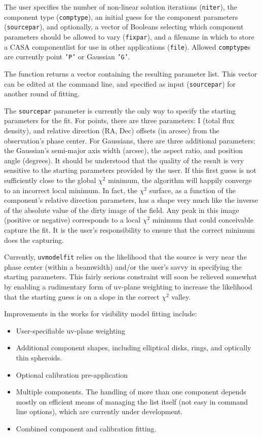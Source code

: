 The user specifies the number of non-linear solution
iterations ({\tt niter}), the component type ({\tt comptype}), an
initial guess for the component parameters ({\tt sourcepar}), and
optionally, a vector of Booleans selecting which component parameters
should be allowed to vary ({\tt fixpar}), and a filename in which to
store a CASA componentlist for use in other applications ({\tt file}).
Allowed {\tt comptype}s are currently point {\tt 'P'} or
Gaussian {\tt 'G'}.

The function returns a vector containing the resulting parameter list.
This vector can be edited at the command line, and specified as input
({\tt sourcepar}) for another round of fitting.

The {\tt sourcepar} parameter is currently the only way to specify the
starting parameters for the fit.  For points, there are three
parameters: I (total flux density), and relative direction (RA, Dec)
offsets (in arcsec) from the observation's phase center.  For
Gaussians, there are three additional parameters: the Gaussian's
semi-major axis width (arcsec), the aspect ratio, and position angle
(degrees).  It should be understood that the quality of the result is
very sensitive to the starting parameters provided by the user.  If
this first guess is not sufficiently close to the global $\chi^2$
minimum, the algorithm will happily converge to an incorrect local
minimum.  In fact, the $\chi^2$ surface, as a function of the
component's relative direction parameters, has a shape very much like
the inverse of the absolute value of the dirty image of the field.
Any peak in this image (positive or negative) corresponds to a local
$\chi^2$ minimum that could conceivable capture the fit.  It is the
user's responsibility to ensure that the correct minimum does the
capturing.

Currently, {\tt uvmodelfit} relies on the likelihood that the source
is very near the phase center (within a beamwidth) and/or the user's
savvy in specifying the starting parameters.  This fairly serious
constraint will soon be relieved somewhat by enabling a rudimentary
form of uv-plane weighting to increase the likelihood that the
starting guess is on a slope in the correct $\chi^2$ valley.

Improvements in the works for visibility model fitting include:

\begin{itemize}
   \item User-specifiable uv-plane weighting
   \item Additional component shapes, including elliptical disks, rings,
         and optically thin spheroids.
   \item Optional calibration pre-application
   \item Multiple components.  The handling of more than one component
         depends mostly on efficient means of managing the list itself (not easy in
         command line options), which are currently under development.
   \item Combined component and calibration fitting.
\end{itemize}

